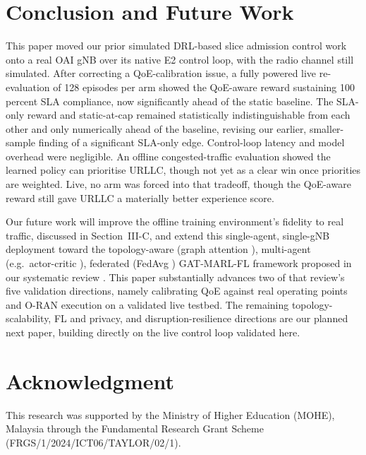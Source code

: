 \documentclass[conference]{IEEEtran}
\begin{document}
\section{Conclusion and Future Work}
This paper moved our prior simulated DRL-based slice admission
control work \cite{mecon-paper1,icraie-paper2} onto a real OAI gNB
over its native E2 control loop, with the radio channel still
simulated. After correcting a QoE-calibration issue, a fully powered
live re-evaluation of 128 episodes per arm showed the QoE-aware
reward sustaining 100 percent SLA compliance, now significantly
ahead of the static baseline. The SLA-only reward and static-at-cap
remained statistically indistinguishable from each other and only
numerically ahead of the baseline, revising our earlier,
smaller-sample finding of a significant SLA-only edge. Control-loop
latency and model overhead were negligible. An offline
congested-traffic evaluation showed the learned policy can
prioritise URLLC, though not yet as a clear win once priorities are
weighted. Live, no arm was forced into that tradeoff, though the
QoE-aware reward still gave URLLC a materially better experience
score.

Our future work will improve the offline training environment's
fidelity to real traffic, discussed in Section~III-C, and extend
this single-agent, single-gNB deployment toward the topology-aware
(graph attention \cite{gat}), multi-agent (e.g.\ actor-critic
\cite{a2c}), federated (FedAvg \cite{fedavg}) GAT-MARL-FL framework
proposed in our systematic review \cite{survey-paper3}. This paper substantially
advances two of that review's five validation directions, namely
calibrating QoE against real operating points and O-RAN execution on
a validated live testbed. The remaining topology-scalability, FL and
privacy, and disruption-resilience directions are our planned next
paper, building directly on the live control loop validated here.

\section*{Acknowledgment}
This research was supported by the Ministry of Higher Education
(MOHE), Malaysia through the Fundamental Research Grant Scheme
(FRGS/1/2024/ICT06/TAYLOR/02/1).



\end{document}
